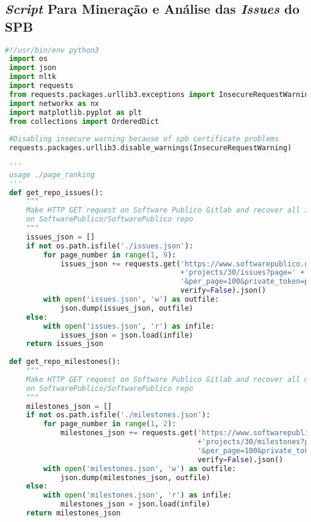 \begin{apendicesenv}

\partapendices

\chapter{\textit{Script} Para Mineração e Análise das \textit{Issues} do SPB}
\label{ape:cod}
\begin{lstlisting}[language=Python, caption=Algoritmo para mineração e análise das \textit{issues} do SPB]
 #!/usr/bin/env python3
 import os
 import json
 import nltk
 import requests
 from requests.packages.urllib3.exceptions import InsecureRequestWarning
 import networkx as nx
 import matplotlib.pyplot as plt
 from collections import OrderedDict
 
 #Disabling insecure warning because of spb certificate problems
 requests.packages.urllib3.disable_warnings(InsecureRequestWarning)
 
 '''
 usage ./page_ranking
 '''
 def get_repo_issues():
     """
     Make HTTP GET request on Software Publico Gitlab and recover all issues
     on SoftwarePublico/SoftwarePublico repo
     """
     issues_json = []
     if not os.path.isfile('./issues.json'):
         for page_number in range(1, 9):
             issues_json += requests.get('https://www.softwarepublico.gov.br/gitlab/api/v3/'
                                         +'projects/30/issues?page=' + str(page_number) +
                                         '&per_page=100&private_token=pUvEiwMsSgJ2JU7DGiaf',
                                         verify=False).json()
         with open('issues.json', 'w') as outfile:
             json.dump(issues_json, outfile)
     else:
         with open('issues.json', 'r') as infile:
             issues_json = json.load(infile)
     return issues_json
 
 def get_repo_milestones():
     """
     Make HTTP GET request on Software Publico Gitlab and recover all milestones
     on SoftwarePublico/SoftwarePublico repo
     """
     milestones_json = []
     if not os.path.isfile('./milestones.json'):
         for page_number in range(1, 2):
             milestones_json += requests.get('https://www.softwarepublico.gov.br/gitlab/api/v3/'
                                             +'projects/30/milestones?page=' + str(page_number) +
                                             '&per_page=100&private_token=pUvEiwMsSgJ2JU7DGiaf',
                                             verify=False).json()
         with open('milestones.json', 'w') as outfile:
             json.dump(milestones_json, outfile)
     else:
         with open('milestones.json', 'r') as infile:
             milestones_json = json.load(infile)
     return milestones_json
 

\end{lstlisting}
\end{apendicesenv}
